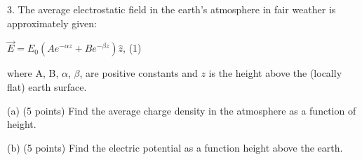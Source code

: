 \documentclass{article}
\begin{document}
\vspace{8pt}

3. The average electrostatic field in the earth's atmosphere in fair weather is approximately given:

\vspace{10pt}

\hspace{5.4cm}$\vec{E} = E_0 (Ae^{-{\alpha}z} + Be^{-{\beta}z})\hat{z}$, \hspace{5cm}(1)
 
\vspace{12pt}

\hspace{0.5cm} where A, B, $\alpha$, $\beta$, are positive constants and $z$ is the height above the (locally flat) earth surface. 

\vspace{12pt}

\hspace{0.7cm} (a) (5 points) Find the average charge density in the atmosphere as a function of height. \\

\vspace{12pt}

\hspace{0.7cm} (b) (5 points) Find the electric potential as a function height above the earth. 
\end{document}
